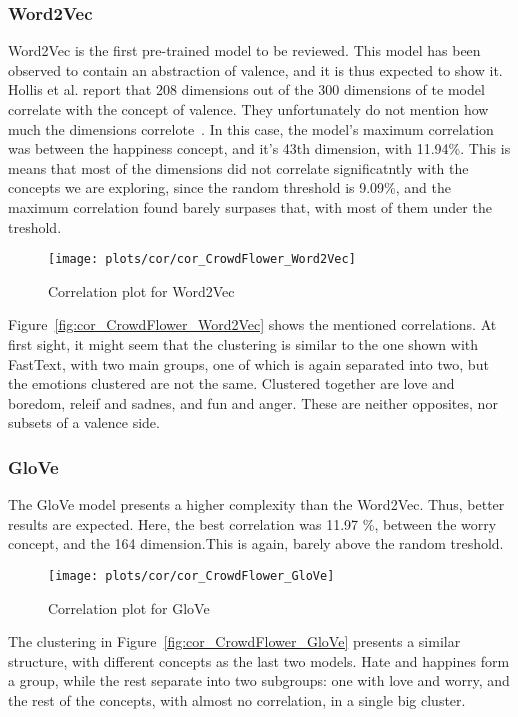 \subsubsection{Word2Vec}
Word2Vec is the first pre-trained model to be reviewed. This model has been observed to contain an abstraction of valence, and it is thus expected to show it. Hollis et al. report that 208 dimensions out of the 300 dimensions of te model correlate with the concept of valence. They unfortunately do not mention how much the dimensions correlote~\cite{hollis2016principals}. In this case, the model's maximum correlation was between the happiness concept, and it's 43th dimension, with 11.94\%. This is means that most of the dimensions did not correlate significatntly with the concepts we are exploring, since the random threshold is 9.09\%, and the maximum correlation found barely surpases that, with most of them under the treshold.

\begin{figure}[H]
  \texttt{[image: plots/cor/cor\_CrowdFlower\_Word2Vec]}
  \centering
  \caption{Correlation plot for Word2Vec}
\end{figure}\label{fig:cor_CrowdFlower_Word2Vec}

Figure~\ref{fig:cor_CrowdFlower_Word2Vec} shows the mentioned correlations. At first sight, it might seem that the clustering is similar to the one shown with FastText, with two main groups, one of which is again separated into two, but the emotions clustered are not the same. Clustered together are love and boredom, releif and sadnes, and fun and anger. These are neither opposites, nor subsets of a valence side.

\subsubsection{GloVe}
The GloVe model presents a higher complexity than the Word2Vec. Thus, better results are expected. Here, the best correlation was 11.97 \%, between the worry concept, and the 164 dimension.This is again, barely above the random treshold.
\begin{figure}[H]
  \texttt{[image: plots/cor/cor\_CrowdFlower\_GloVe]}
  \centering
  \caption{Correlation plot for GloVe}
\end{figure}\label{fig:cor_CrowdFlower_GloVe}
The clustering in Figure~\ref{fig:cor_CrowdFlower_GloVe} presents a similar structure, with different concepts as the last two models. Hate and happines form a group, while the rest separate into two subgroups: one with love and worry, and the rest of the concepts, with almost no correlation, in a single big cluster.

